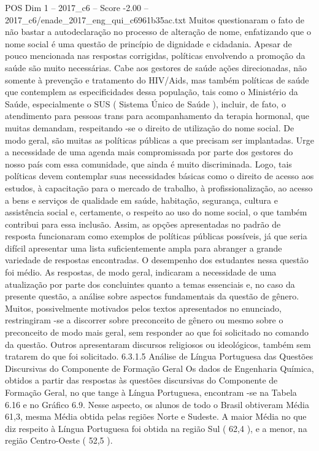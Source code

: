 \begin{textsample}{POS Dim 1 – 2017\_c6 – Score -2.00 – 2017\_c6/enade\_2017\_eng\_qui\_c6961b35ac.txt}
Muitos questionaram o fato de não bastar a autodeclaração no processo de alteração de nome, enfatizando que o nome social é uma questão de princípio de dignidade e cidadania.
Apesar de pouco mencionada nas respostas corrigidas, políticas envolvendo a promoção da saúde são muito necessárias.
Cabe aos gestores de saúde ações direcionadas, não somente à prevenção e tratamento do HIV/Aids, mas também políticas de saúde que contemplem as especificidades dessa população, tais como o Ministério da Saúde, especialmente o SUS ( Sistema Único de Saúde ), incluir, de fato, o atendimento para pessoas trans para acompanhamento da terapia hormonal, que muitas demandam, respeitando -se o direito de utilização do nome social.
De modo geral, são muitas as políticas públicas a que precisam ser implantadas.
Urge a necessidade de uma agenda mais compromissada por parte dos gestores do nosso país com essa comunidade, que ainda é muito discriminada.
Logo, tais políticas devem contemplar suas necessidades básicas como o direito de acesso aos estudos, à capacitação para o mercado de trabalho, à profissionalização, ao acesso a bens e serviços de qualidade em saúde, habitação, segurança, cultura e assistência social e, certamente, o respeito ao uso do nome social, o que também contribui para essa inclusão.
Assim, as opções apresentadas no padrão de resposta funcionaram como exemplos de políticas públicas possíveis, já que seria difícil apresentar uma lista suficientemente ampla para abranger a grande variedade de respostas encontradas.
O desempenho dos estudantes nessa questão foi médio.
As respostas, de modo geral, indicaram a necessidade de uma atualização por parte dos concluintes quanto a temas essenciais e, no caso da presente questão, a análise sobre aspectos fundamentais da questão de gênero.
Muitos, possivelmente motivados pelos textos apresentados no enunciado, restringiram -se a discorrer sobre preconceito de gênero ou mesmo sobre o preconceito de modo mais geral, sem responder ao que foi solicitado no comando da questão.
Outros apresentaram discursos religiosos ou ideológicos, também sem tratarem do que foi solicitado. 6.3.1.5 Análise de Língua Portuguesa das Questões Discursivas do Componente de Formação Geral Os dados de Engenharia Química, obtidos a partir das respostas às questões discursivas do Componente de Formação Geral, no que tange à Língua Portuguesa, encontram -se na Tabela 6.16 e no Gráfico 6.9.
Nesse aspecto, os alunos de todo o Brasil obtiveram Média 61,3, mesma Média obtida pelas regiões Norte e Sudeste.
A maior Média no que diz respeito à Língua Portuguesa foi obtida na região Sul ( 62,4 ), e a menor, na região Centro-Oeste ( 52,5 ).

\end{textsample}
